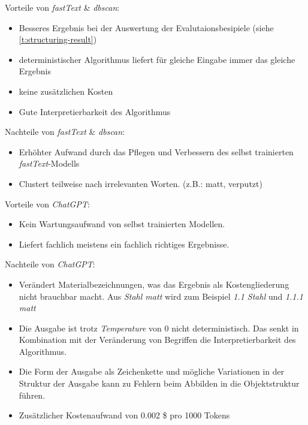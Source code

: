 \noindent Vorteile von \textit{fastText} \& \textit{\ac{dbscan}}:
\begin{itemize}
	\setlength\itemsep{0em}
	\item Besseres Ergebnis bei der Auswertung der Evalutaionsbesipiele (siehe \autoref{t:structuring-result})
	\item deterministischer Algorithmus liefert für gleiche Eingabe immer das gleiche Ergebnis
	\item keine zusätzlichen Kosten
	\item Gute Interpretierbarkeit des Algorithmus
\end{itemize}
Nachteile von \textit{fastText} \& \textit{\ac{dbscan}}:
\begin{itemize}
	\setlength\itemsep{0em}
	\item Erhöhter Aufwand durch das Pflegen und Verbessern des selbst trainierten \textit{fastText}-Modells
	\item Clustert teilweise nach irrelevanten Worten. (z.B.: matt, verputzt)
\end{itemize}
Vorteile von \textit{ChatGPT}:
\begin{itemize}
	\setlength\itemsep{0em}
	\item Kein Wartungsaufwand von selbst trainierten Modellen.
	\item Liefert fachlich meistens ein fachlich richtiges Ergebnisse.
\end{itemize}
Nachteile von \textit{ChatGPT}:
\begin{itemize}
	\setlength\itemsep{0em}
	\item Verändert Materialbezeichnungen, was das Ergebnis als Kostengliederung nicht brauchbar macht. Aus \textit{Stahl matt} wird zum Beispiel \textit{1.1 Stahl} und \textit{1.1.1 matt}
	\item Die Ausgabe ist trotz \textit{Temperature} von 0 nicht deterministisch. Das senkt in Kombination mit der Veränderung von Begriffen die Interpretierbarkeit des Algorithmus.
	\item Die Form der Ausgabe als Zeichenkette und mögliche Variationen in der Struktur der Ausgabe kann zu Fehlern beim Abbilden in die Objektstruktur führen.
	\item Zusätzlicher Kostenaufwand von 0.002 \$ pro 1000 Tokens
\end{itemize}
